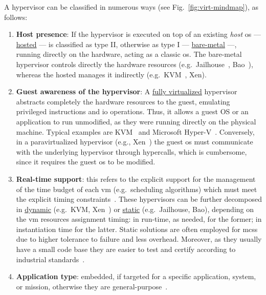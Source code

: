 A hypervisor can be classified in numerous ways (see
Fig.~\ref{fig:virt-mindmap}), as follows:
\begin{enumerate}
\item \textbf{Host presence}: If the hypervisor is executed on top of an
  existing \emph{host} \gls{os} --- \underline{hosted} --- is classified as type II,
  otherwise as type I --- \underline{bare-metal} ---, running directly on the hardware,
  acting as a classic \gls{os}. The bare-metal hypervisor controls directly the
  hardware resources (e.g.~Jailhouse~\cite{jailhouse}, Bao~\cite{martins_et_al:OASIcs:2020:11779}), whereas the hosted manages it
  indirectly (e.g.~KVM~\cite{kivity2007kvm}, Xen).
\item \textbf{Guest awareness of the hypervisor}: A \underline{fully virtualized} hypervisor
  abstracts completely the hardware resources to the guest, emulating privileged
  instructions and \gls{io} operations. Thus, it allows a guest OS or an
  application to run unmodified, as they were running directly on the physical
  machine. Typical examples are KVM~\cite{kivity2007kvm} and Microsoft Hyper-V~\cite{microsoftHyperV}. Conversely, in a
  paravirtualized hypervisor (e.g., Xen~\cite{barham2003xen}) the guest \gls{os}
  must communicate with the underlying hypervisor through hypercalls, which is
  cumbersome, since it requires the guest \gls{os} to be modified.
\item \textbf{Real-time support}: this refers to the explicit support for the
  management of the time budget of each \gls{vm} (e.g.~scheduling algorithms)
  which must meet the explicit timing
  constraints~\cite{cinque2022virtualizing}. These hypervisors can be further
  decomposed in \underline{dynamic} (e.g.~KVM\cite{kivity2007kvm},
  Xen~\cite{barham2003xen}) or \underline{static} (e.g.~Jailhouse\cite{jailhouse}, Bao\cite{martins_et_al:OASIcs:2020:11779}), depending on the
  \gls{vm} resources assignment timing: in run-time, as needed, for the former;
  in instantiation time for the latter. Static solutions are often employed for
  \glspl{mcs} due to higher tolerance to failure and less overhead. Moreover, as
  they usually have a small code base they are easier to test and certify
  according to industrial standards~\cite{cinque2022virtualizing}.
\item \textbf{Application type}: embedded, if targeted for a specific application, system, or mission, otherwise they are general-purpose~\cite{heiser2008role}.
\end{enumerate}

